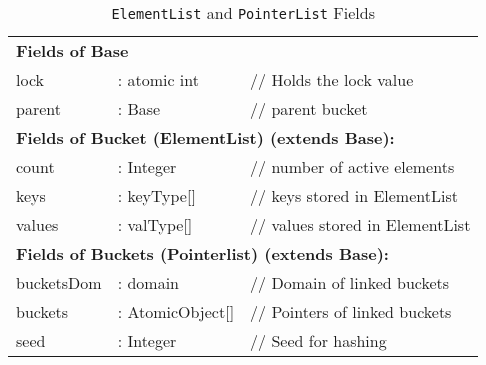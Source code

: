 \documentclass[letterpaper, 10 pt, conference]{ieeeconf}  %
\begin{document}
\begin{table}
    \centering
    \caption{\texttt{ElementList} and \texttt{PointerList} Fields}
    \label{tab:base_objects}
    \begin{tabular}{l l l}
        \multicolumn{3}{l}{\textbf{Fields of Base}} \\
        lock & : atomic int & // Holds the lock value \\
        parent & : Base & // parent bucket \\
        
        \multicolumn{3}{l}{\textbf{Fields of Bucket (ElementList) (extends Base):}} \\
        count & : Integer & // number of active elements \\
        keys & : keyType[] & // keys stored in ElementList \\
        values & : valType[] & // values stored in ElementList \\
        
        \multicolumn{3}{l}{\textbf{Fields of Buckets (Pointerlist) (extends Base):}} \\
        bucketsDom & : domain & // Domain of linked buckets \\
        buckets & : AtomicObject[] & // Pointers of linked buckets \\
        seed & : Integer & // Seed for hashing \\
    \end{tabular}
\end{table}
\end{document}
